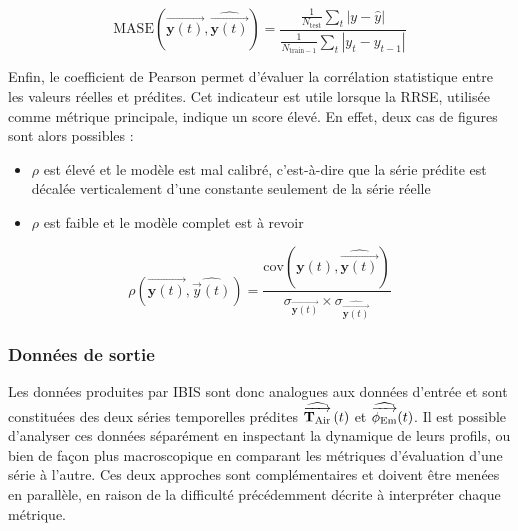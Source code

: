             \begin{equation}
                \mathrm{MASE}\left(\overrightarrow {\mathbf y(t)}, \widehat{\overrightarrow{\mathbf y(t)}}\right) = \frac{\frac{1}{N_{\text{test}}}\sum_t\left|y-\hat y\right|}{\frac{1}{N_{\text{train} - 1}}\sum_t\left| y_t - y_{t-1} \right|}\label{eq:MASE}
            \end{equation}

            Enfin, le coefficient de Pearson permet d'évaluer la corrélation statistique entre les valeurs réelles et prédites.
            Cet indicateur est utile lorsque la RRSE, utilisée comme métrique principale, indique un score élevé.
            En effet, deux cas de figures sont alors possibles :
            \begin{itemize}
                \item $\rho$ est élevé et le modèle est mal calibré, c'est-à-dire que la série prédite est décalée verticalement d'une constante seulement de la série réelle
                \item $\rho$ est faible et le modèle complet est à revoir
            \end{itemize}

            \begin{equation}
                \rho\left(\overrightarrow {\mathbf y(t)}, \widehat{\overrightarrow{y}(t)}\right) = \frac{\text{cov}\left(\mathbf y(t),\widehat{\overrightarrow{\mathbf y(t)}}\right)}{\sigma_{\overrightarrow {\mathbf y(t)}}\times\sigma_{\widehat{\overrightarrow{\mathbf y(t)}}}} \label{eq:Pearson}
            \end{equation}
        \subsubsection{Données de sortie}
            Les données produites par IBIS sont donc analogues aux données d'entrée et sont constituées des deux séries temporelles prédites $\operatorname{\widehat{\overrightarrow{\mathbf{T}_{\text{Air}}}}}\left(t\right)$ et $\operatorname{\widehat{\overrightarrow{\phi_{\text{Em}}}}}(t)$.
            Il est possible d'analyser ces données séparément en inspectant la dynamique de leurs profils, ou bien de façon plus macroscopique en comparant les métriques d'évaluation d'une série à l'autre.
            Ces deux approches sont complémentaires et doivent être menées en parallèle, en raison de la difficulté précédemment décrite à interpréter chaque métrique.

